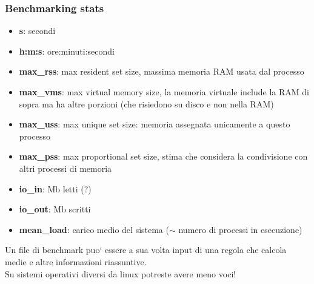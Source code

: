 \documentclass[xcolor=table]{beamer}
\begin{document}
\begin{frame}[fragile]
\frametitle{Benchmarking stats}
\footnotesize{
\begin{itemize}
\item \textbf{s}: secondi
\item \textbf{h:m:s}: \textcolor{novak}{ore:minuti:secondi}
\item \textbf{max\_rss}: \textcolor{galon}{max resident set size}, massima memoria RAM usata dal processo
\item \textbf{max\_vms}: max virtual memory size, la memoria virtuale include la RAM di sopra ma ha altre porzioni (che risiedono su disco e non nella RAM)
\item \textbf{max\_uss}: max unique set size: memoria assegnata unicamente a questo processo
\item \textbf{max\_pss}: max proportional set size, stima che considera la condivisione con altri processi di memoria
\item \textbf{io\_in}: Mb letti (?)
\item \textbf{io\_out}: Mb scritti
\item \textbf{mean\_load}: carico medio del sistema ($\sim$ numero di processi in esecuzione)
\end{itemize}
}
Un file di benchmark puo` essere a sua volta input di una regola che calcola medie e altre informazioni
riassuntive. \\
Su sistemi operativi diversi da linux potreste avere meno voci!
\end{frame}

\end{document}
